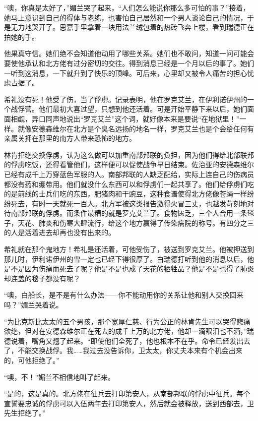 \par “噢，你真是太好了，”媚兰哭了起来，“人们怎么能说你那么多可怕的事？”接着，她马上意识到自己的得体与老练，也害怕自己居然和一个男人谈论自己的情况，于是无力地哭开了。思嘉手里拿着一块用法兰绒包着的热砖飞奔上楼，看到瑞德正在拍她的手。
\par 他果真守信。她们绝不会知道他动用了哪些关系。她们也不敢问，知道一问可能会要使他承认和北方佬有过分密切的交往。得到消息已经是一个月以后的事了。她们一听到这消息，一下就升到了快乐的顶峰。可后来，心里却又被令人痛苦的担心忧虑占据了。
\par 希礼没有死！他受了伤，当了俘虏。记录表明，他在罗克艾兰，在伊利诺伊州的一个战俘营。他们最初大喜过望，只想到他还活着。可是开始平静下来以后，她们面面相觑，异口同声地说出“罗克艾兰”这个词，就好像本来是要说“在地狱里！”一样。就像安德森维尔在北方是个臭名远扬的地名一样，罗克艾兰也是个会给任何有亲属关押在那里的南方人带来恐怖的地方。
\par 林肯拒绝交换俘虏，认为这么做可以加重南部邦联的负担，因为他们得给北部联邦的俘虏吃饭，还得看管他们，这样便可以促使战争早日结束。佐治亚的安德森维尔已经有成千上万穿蓝色军服的人。南部邦联的人缺乏配给，实际上连自己的伤病员都没有药和绷带用。他们就没什么东西可以和俘虏们一起共享了。他们给俘虏们吃的是前线的士兵们吃的东西，肥猪肉和干豌豆，这种食谱使得北方佬像苍蝇一样纷纷死去，有时一天就死一百人。北方军被这类报告激得火冒三丈，也越发苛刻地对待南部邦联的俘虏。而条件最糟的就是罗克艾兰了。食物匮乏，三个人合用一条毯子，天花、肺炎和伤寒大肆流行，给这个地方赢得了传染病院的称号。有四分之三的人是活着进去却再也没有出来的。
\par 希礼就在那个鬼地方！希礼是还活着，可他受伤了，被送到罗克艾兰。他被押送到那儿时，伊利诺伊州的雪一定也已经下得很厚了。白瑞德打听到他的消息以后，他是不是因为伤痛而死去了呢？他是不是也成了天花的牺牲品？他是不是也得了肺炎却连盖的毯子都没有呢？
\par “噢，白船长，是不是有什么办法——你不能动用你的关系让他和别人交换回来吗？”媚兰哭着说。
\par “为比克斯比太太的五个男孩，那个宽厚仁慈、行为公正的林肯先生可以哭得悲痛欲绝，但对在安德森维尔正在死去的成千上万的北方佬，他却一滴眼泪也不洒，”瑞德说着，嘴角又翘了起来。“即使他们全死了，他也根本不在乎。命令已经发出去了，不能交换战俘。我……我过去没告诉你，卫太太，你丈夫本来有个机会出来的，可他拒绝了。”
\par “噢，不！”媚兰不相信地叫了起来。
\par “是的，这是真的。北方佬在征兵去打印第安人，从南部邦联的俘虏中征兵。每个宣誓要忠诚的俘虏可以入伍两年去打印第安人，然后就会被释放，送到西部去，卫先生拒绝了。”
